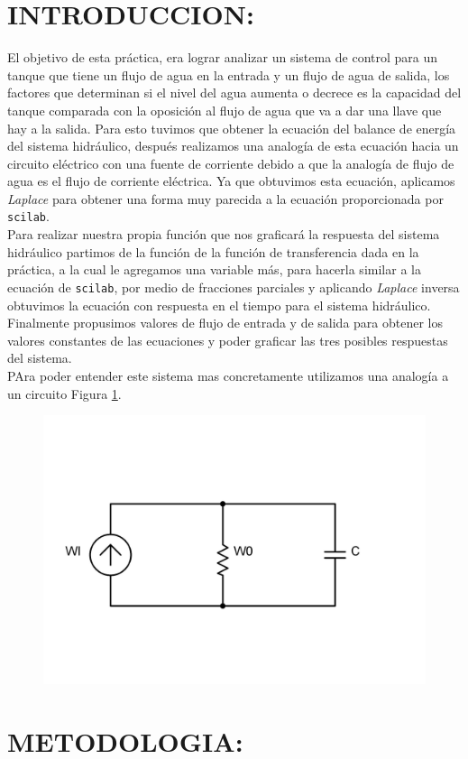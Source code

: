 \documentclass[letterpaper,10pt]{article}
\begin{document}
	\section{INTRODUCCION:}
	El objetivo de esta práctica, era lograr analizar un sistema de control para un tanque que tiene un flujo de
	agua en la entrada y un flujo de agua de salida, los factores que determinan si el nivel del agua aumenta o decrece 
	es la capacidad del tanque comparada con la oposición al flujo de agua que va a dar una llave que hay a la salida.
	Para esto tuvimos que obtener la ecuación del balance de energía del sistema hidráulico, después realizamos una analogía 
	de esta ecuación hacia un circuito eléctrico con una fuente de corriente debido a que la analogía de flujo de agua
	es el flujo de corriente eléctrica. Ya que obtuvimos esta ecuación, aplicamos \textit{Laplace} para obtener una forma muy parecida
	a la ecuación proporcionada por \texttt{scilab}.\\
	
	Para realizar nuestra propia función que nos graficará la respuesta del sistema hidráulico partimos de la función de 
	la función de transferencia dada en la práctica, a la cual le agregamos una variable más, para hacerla similar a
	la ecuación de \texttt{scilab}, por medio de fracciones parciales y aplicando \textit{Laplace} inversa obtuvimos la ecuación con respuesta en 
	el tiempo para el sistema hidráulico. Finalmente propusimos valores de flujo de entrada y de salida para obtener los valores
	constantes de las ecuaciones y poder graficar las tres posibles respuestas del sistema.\\
	PAra poder entender este sistema mas concretamente utilizamos una analogía a un circuito Figura \ref{fig:circ}.
	
	\begin{figure}[h!]
		\centering
		\includegraphics[width=0.4\linewidth]{circ}
		\caption{}
		\label{fig:circ}
	\end{figure}
	\pagebreak
	\section{METODOLOGIA:}
\end{document}

